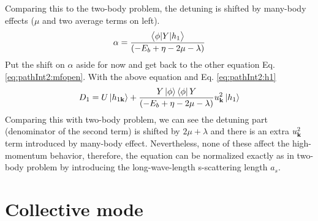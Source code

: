 Comparing this to the two-body problem, the detuning is shifted by many-body effects ($\mu$ and two average terms on left).  
\begin{equation}\label{eq:pathInt2:alpha}
\alpha=\frac{\bigl<{\phi{\lvert{Y}\rvert}h_{1}}\bigr>}{\left(-E_{b}+\eta-2\mu-\lambda\right)}
\end{equation}
Put the shift on $\alpha$ aside for now and get back to the other equation Eq. \ref{eq:pathInt2:mfopen}.  With the above equation and Eq. \ref{eq:pathInt2:h1}
\begin{equation*}
D_{1}=U\left|h_{1\mathbf{k}}\right>+\frac{Y\left|\phi\right>\left<\phi\right|{Y}}{\left(-E_{b}+\eta-2\mu-\lambda\right)}u_{\mathbf{k}}^{2}\left|{h_{1}}\right>
\end{equation*}
Comparing this with two-body problem, we can see the detuning part (denominator of the second term) is shifted by $2\mu+\lambda$ and there is an extra $u_{\mathbf{k}}^{2}$ term introduced by many-body effect.  Nevertheless, none of these affect the high-momentum behavior, therefore, the equation can be normalized exactly as in two-body problem by introducing the long-wave-length s-scattering length $a_{s}$.  


%

\section{Collective mode}
%

